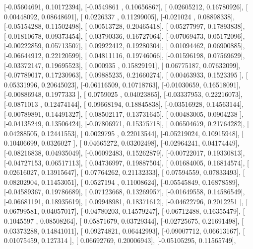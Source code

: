 \documentclass{article}
\begin{document}
       [-0.05604691,  0.10172394],
       [-0.0549861 ,  0.10656867],
       [ 0.02605212,  0.16780926],
       [ 0.00448092,  0.08648691],
       [ 0.0226337 ,  0.11299005],
       [-0.021024  ,  0.08898338],
       [-0.05154288,  0.11502498],
       [ 0.00513728,  0.20465418],
       [ 0.05277997,  0.17893838],
       [-0.01810678,  0.09373454],
       [ 0.03790336,  0.16727064],
       [-0.07069473,  0.05172096],
       [-0.00222859,  0.05713507],
       [ 0.09922412,  0.19280304],
       [ 0.01094462,  0.06900885],
       [-0.06644912,  0.22120599],
       [ 0.04811116,  0.19746066],
       [-0.01596198,  0.07569629],
       [-0.03372147,  0.19695523],
       [ 0.000935  ,  0.15829191],
       [ 0.06775187,  0.07632099],
       [-0.07789017,  0.17230963],
       [ 0.09885235,  0.21660274],
       [ 0.00463933,  0.1523395 ],
       [ 0.05331996,  0.20645023],
       [-0.06116509,  0.10718763],
       [-0.01030659,  0.16518091],
       [-0.00886948,  0.1977333 ],
       [ 0.0759025 ,  0.04023865],
       [-0.03337953,  0.22216073],
       [-0.0871013 ,  0.12474144],
       [ 0.09668194,  0.18845838],
       [-0.03516928,  0.14563144],
       [-0.00789891,  0.14491327],
       [ 0.08502117,  0.13731645],
       [ 0.00483005,  0.0904238 ],
       [-0.04135249,  0.13506424],
       [-0.07806971,  0.15375718],
       [ 0.06504679,  0.21764282],
       [ 0.04288505,  0.12441553],
       [ 0.0029795 ,  0.22013544],
       [-0.05219024,  0.10915948],
       [ 0.10406699,  0.0326027 ],
       [ 0.04665272,  0.03202498],
       [-0.02964241,  0.04174449],
       [-0.08216838,  0.04935049],
       [-0.06092483,  0.15262879],
       [-0.00722017,  0.19330813],
       [-0.04727153,  0.06517113],
       [ 0.04736997,  0.19887504],
       [ 0.01684005,  0.16814574],
       [ 0.02616027,  0.13915647],
       [ 0.07764262,  0.21132333],
       [ 0.07594559,  0.07833493],
       [ 0.08202904,  0.11453051],
       [ 0.0527194 ,  0.11008624],
       [-0.05545849,  0.16878589],
       [-0.04589367,  0.19786689],
       [ 0.07123668,  0.13269957],
       [-0.01649558,  0.14586549],
       [-0.06681191,  0.18935619],
       [ 0.09948981,  0.18371612],
       [-0.04622796,  0.2012251 ],
       [ 0.06799581,  0.04057017],
       [-0.04780203,  0.14579247],
       [-0.06712488,  0.16355479],
       [ 0.1045597 ,  0.08508264],
       [ 0.05871679,  0.03729344],
       [-0.02725675,  0.21691498],
       [ 0.03373288,  0.14841011],
       [ 0.09274821,  0.06442993],
       [-0.09007712,  0.06613167],
       [ 0.01075459,  0.127314  ],
       [ 0.06692769,  0.20006943],
       [-0.05105295,  0.11565749],
\end{document}
